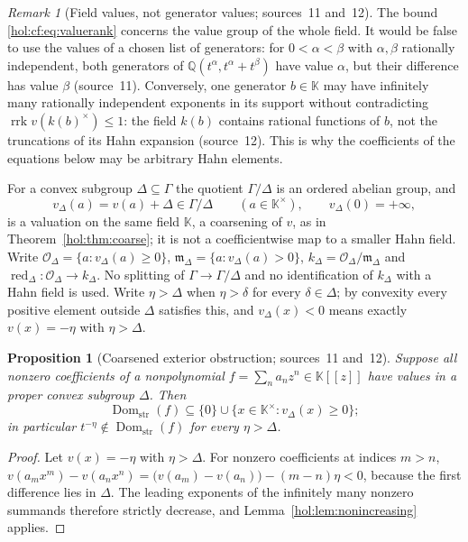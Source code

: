 \documentclass[11pt]{article}
\numberwithin{equation}{section}
\newtheorem{proposition}[theorem]{Proposition}
\theoremstyle{definition}
\theoremstyle{remark}
\newtheorem{remark}[theorem]{Remark}
\newcommand{\Q}{\mathbb Q}
\newcommand{\Dom}{\operatorname{Dom}_{\mathrm{str}}}
\newcommand{\KK}{\mathbb K}
\newcommand{\rrk}{\operatorname{rrk}}
\newcommand{\red}{\operatorname{red}}
\begin{document}
\begin{remark}[Field values, not generator values; sources~11 and~12]
\label{hol:cf:rem:cancellation}
The bound \eqref{hol:cf:eq:valuerank} concerns the value group of the whole
field. It would be false to use the values of a chosen list of generators:
for $0<\alpha<\beta$ with $\alpha,\beta$ rationally independent, both
generators of $\Q(t^\alpha,t^\alpha+t^\beta)$ have value $\alpha$, but their
difference has value $\beta$ (source~11). Conversely, one generator $b\in\KK$
may have infinitely many rationally independent exponents in its support
without contradicting $\rrk v(k(b)^\times)\le1$: the field $k(b)$ contains
rational functions of $b$, not the truncations of its Hahn expansion
(source~12). This is why the coefficients of the equations below may be
arbitrary Hahn elements.
\end{remark}

For a convex subgroup $\Delta\subseteq\Gamma$ the quotient $\Gamma/\Delta$ is
an ordered abelian group, and
\[
 v_\Delta(a)=v(a)+\Delta\in\Gamma/\Delta\qquad(a\in\KK^\times),
 \qquad v_\Delta(0)=+\infty,
\]
is a valuation on the same field $\KK$, a coarsening of $v$, as in
Theorem~\ref{hol:thm:coarse}; it is not a coefficientwise map to a smaller
Hahn field. Write $\mathcal O_\Delta=\{a:v_\Delta(a)\ge0\}$,
$\mathfrak m_\Delta=\{a:v_\Delta(a)>0\}$, $k_\Delta=\mathcal O_\Delta/\mathfrak
m_\Delta$ and $\red_\Delta:\mathcal O_\Delta\to k_\Delta$. No splitting of
$\Gamma\to\Gamma/\Delta$ and no identification of $k_\Delta$ with a Hahn field
is used. Write $\eta>\Delta$ when $\eta>\delta$ for every $\delta\in\Delta$;
by convexity every positive element outside $\Delta$ satisfies this, and
$v_\Delta(x)<0$ means exactly $v(x)=-\eta$ with $\eta>\Delta$.

\begin{proposition}[Coarsened exterior obstruction; sources~11 and~12]
\label{hol:cf:prop:exterior}
Suppose all nonzero coefficients of a nonpolynomial $f=\sum_na_nz^n\in\KK[[z]]$
have values in a proper convex subgroup $\Delta$. Then
\begin{equation}\label{hol:cf:eq:exterior}
 \Dom(f)\subseteq\{0\}\cup\{x\in\KK^\times:v_\Delta(x)\ge0\};
\end{equation}
in particular $t^{-\eta}\notin\Dom(f)$ for every $\eta>\Delta$.
\end{proposition}

\begin{proof}
Let $v(x)=-\eta$ with $\eta>\Delta$. For nonzero coefficients at indices
$m>n$,
$v(a_mx^m)-v(a_nx^n)=\bigl(v(a_m)-v(a_n)\bigr)-(m-n)\eta<0$, because the first
difference lies in $\Delta$. The leading exponents of the infinitely many
nonzero summands therefore strictly decrease, and
Lemma~\ref{hol:lem:nonincreasing} applies.
\end{proof}
\end{document}
